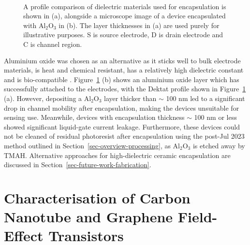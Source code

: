 \documentclass[
  a4paper,
]{scrbook}
\begin{document}
\begin{figure}
\begin{minipage}[t]{0.42\linewidth}
{{}

}

\end{minipage}%
%
\begin{minipage}[t]{0.01\linewidth}

{\centering 

~

}

\end{minipage}%

\caption[A profile comparison of dielectric materials used for
encapsulation, alongside a microscope image of a device encapsulated
with alumina.]{\label{fig-dektat-dielectric-layer}A profile comparison
of dielectric materials used for encapsulation is shown in (a),
alongside a microscope image of a device encapsulated with
Al\(_2\)O\(_3\) in (b). The layer thicknesses in (a) are used purely for
illustrative purposes. S is source electrode, D is drain electrode and C
is channel region.}

\end{figure}

Aluminium oxide was chosen as an alternative as it sticks well to bulk
electrode materials, is heat and chemical resistant, has a relatively
high dielectric constant and is bio-compatible
\autocite{Guarnieri2014,Albarghouthi2022,Kolodzey2000}.
Figure~\ref{fig-dektat-dielectric-layer} (b) shows an aluminium oxide
layer which has successfully attached to the electrodes, with the Dektat
profile shown in Figure~\ref{fig-dektat-dielectric-layer} (a). However,
depositing a Al\(_2\)O\(_3\) layer thicker than \(\sim\) 100 nm led to a
significant drop in channel mobility after encapsulation, making the
devices unsuitable for sensing use. Meanwhile, devices with
encapsulation thickness \(\sim\) 100 nm or less showed significant
liquid-gate current leakage. Furthermore, these devices could not be
cleaned of residual photoresist after encapsulation using the post-Jul
2023 method outlined in Section~\ref{sec-overview-processing}, as
Al\(_2\)O\(_3\) is etched away by TMAH. Alternative approaches for
high-dielectric ceramic encapsulation are discussed in
Section~\ref{sec-future-work-fabrication}.

\hypertarget{characterisation-of-carbon-nanotube-and-graphene-field-effect-transistors}{%
\section{Characterisation of Carbon Nanotube and Graphene Field-Effect
Transistors}\label{characterisation-of-carbon-nanotube-and-graphene-field-effect-transistors}}
\end{document}
